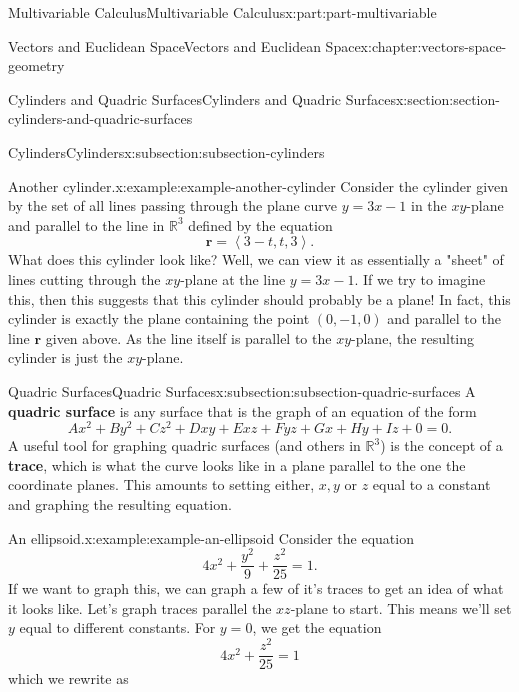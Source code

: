 \documentclass[twoside,10pt,]{tufte-book}
\newcommand{\terminology}[1]{\textbf{#1}}
\numberwithin{equation}{part}
\newcommand{\RR}{\mathbb{R}}
\newcommand{\dotprod}[1]{\left\langle #1 \right\rangle}
\begin{document}
\begin{partptx}{Multivariable Calculus}{}{Multivariable Calculus}{}{}{x:part:part-multivariable}
\begin{chapterptx}{Vectors and Euclidean Space}{}{Vectors and Euclidean Space}{}{}{x:chapter:vectors-space-geometry}
\begin{sectionptx}{Cylinders and Quadric Surfaces}{}{Cylinders and Quadric Surfaces}{}{}{x:section:section-cylinders-and-quadric-surfaces}
\begin{subsectionptx}{Cylinders}{}{Cylinders}{}{}{x:subsection:subsection-cylinders}
\begin{example}{Another cylinder.}{x:example:example-another-cylinder}%
Consider the cylinder given by the set of all lines passing through the plane curve \(y = 3x-1\) in the \(xy\)-plane and parallel to the line in \(\RR^{3}\) defined by the equation%
%
\begin{equation*}
\mathbf{r} = \dotprod{3-t,t,3}.
\end{equation*}
What does this cylinder look like? Well, we can view it as essentially a "sheet" of lines cutting through the \(xy\)-plane at the line \(y = 3x-1\). If we try to imagine this, then this suggests that this cylinder should probably be a plane! In fact, this cylinder is exactly the plane containing the point \((0,-1,0)\) and parallel to the line \(\mathbf{r}\) given above. As the line itself is parallel to the \(xy\)-plane, the resulting cylinder is just the \(xy\)-plane.%
\end{example}
\end{subsectionptx}
%
%
\typeout{************************************************}
\typeout{************************************************}
%
\begin{subsectionptx}{Quadric Surfaces}{}{Quadric Surfaces}{}{}{x:subsection:subsection-quadric-surfaces}
A \terminology{quadric surface} is any surface that is the graph of an equation of the form%
%
\begin{equation*}
Ax^{2}+By^{2}+Cz^{2}+Dxy+Exz+Fyz+Gx+Hy+Iz+0 = 0.
\end{equation*}
A useful tool for graphing quadric surfaces (and others in \(\RR^{3}\)) is the concept of a \terminology{trace}, which is what the curve looks like in a plane parallel to the one the coordinate planes. This amounts to setting either, \(x,y\) or \(z\) equal to a constant and graphing the resulting equation.%
\begin{example}{An ellipsoid.}{x:example:example-an-ellipsoid}%
Consider the equation%
%
\begin{equation*}
4x^{2}+\frac{y^{2}}{9}+\frac{z^{2}}{25} = 1.
\end{equation*}
If we want to graph this, we can graph a few of it's traces to get an idea of what it looks like. Let's graph traces parallel the \(xz\)-plane to start. This means we'll set \(y\) equal to different constants. For \(y=0\), we get the equation%
%
\begin{equation*}
4x^{2}+\frac{z^{2}}{25} = 1
\end{equation*}
which we rewrite as%

\end{example}
\end{subsectionptx}
\end{sectionptx}
\end{chapterptx}
\end{partptx}
\end{document}
